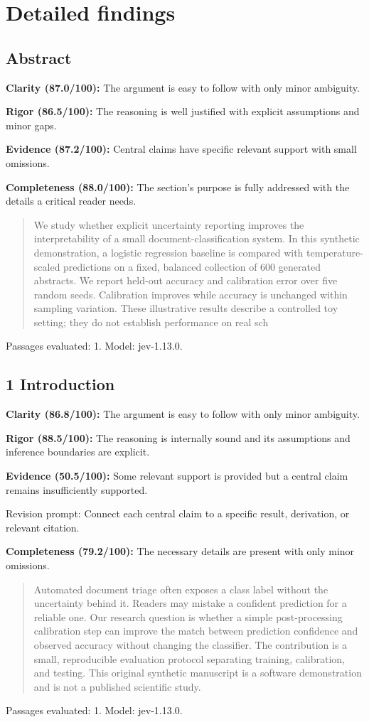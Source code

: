 \documentclass[11pt]{article}
\begin{document}
\section{Detailed findings}
\subsection{Abstract}
\par\textbf{Clarity (87.0/100):} The argument is easy to follow with only minor ambiguity.
\par\textbf{Rigor (86.5/100):} The reasoning is well justified with explicit assumptions and minor gaps.
\par\textbf{Evidence (87.2/100):} Central claims have specific relevant support with small omissions.
\par\textbf{Completeness (88.0/100):} The section's purpose is fully addressed with the details a critical reader needs.
\begin{quote}\small We study whether explicit uncertainty reporting improves the interpretability of a small
document-classification system. In this synthetic demonstration, a logistic regression baseline is
compared with temperature-scaled predictions on a fixed, balanced collection of 600 generated
abstracts. We report held-out accuracy and calibration error over five random seeds. Calibration
improves while accuracy is unchanged within sampling variation. These illustrative results describe a
controlled toy setting; they do not establish performance on real sch\end{quote}
Passages evaluated: 1. Model: jev-1.13.0.
\subsection{1 Introduction}
\par\textbf{Clarity (86.8/100):} The argument is easy to follow with only minor ambiguity.
\par\textbf{Rigor (88.5/100):} The reasoning is internally sound and its assumptions and inference boundaries are explicit.
\par\textbf{Evidence (50.5/100):} Some relevant support is provided but a central claim remains insufficiently supported.
\par Revision prompt: Connect each central claim to a specific result, derivation, or relevant citation.
\par\textbf{Completeness (79.2/100):} The necessary details are present with only minor omissions.
\begin{quote}\small Automated document triage often exposes a class label without the uncertainty behind it. Readers may
mistake a confident prediction for a reliable one. Our research question is whether a simple
post-processing calibration step can improve the match between prediction confidence and observed
accuracy without changing the classifier. The contribution is a small, reproducible evaluation protocol
separating training, calibration, and testing. This original synthetic manuscript is a software
demonstration and is not a published scientific study.\end{quote}
Passages evaluated: 1. Model: jev-1.13.0.
\end{document}
